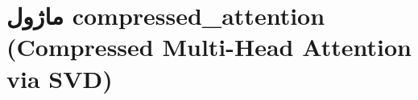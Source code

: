 \section{ماژول compressed\_attention (Compressed Multi-Head Attention via SVD)}
\label{sec:module_compressed_attention}
